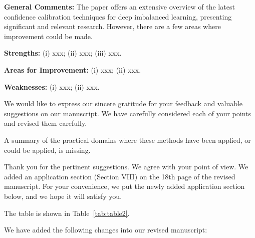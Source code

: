 
\reviewer

\begin{generalcomment}
    \textbf{General Comments:} The paper offers an extensive overview of the latest confidence calibration techniques for deep imbalanced learning, presenting significant and relevant research. However, there are a few areas where improvement could be made.
   
    \textbf{Strengths:} (i) xxx; (ii) xxx; (iii) xxx.

    \textbf{Areas for Improvement:} (i) xxx; (ii) xxx. 
     
    \textbf{Weaknesses:} (i) xxx; (ii) xxx. 

\end{generalcomment}
\begin{revmeta}[]
	We would like to express our sincere gratitude for your feedback and valuable suggestions on our manuscript. We have carefully considered each of your points and revised them carefully.
\end{revmeta}

\begin{revcomment}
A summary of the practical domains where these methods have been applied, or could be applied, is missing.
\label{com:rev1:Q1}
\end{revcomment}
\begin{revresponse}[]
	Thank you for the pertinent suggestions. We agree with your point of view. We added an application section (Section VIII) on the 18th page of the revised manuscript. For your convenience, we put the newly added application section below, and we hope it will satisfy you.
	
	
	\lipsum[4] \cite{gao2022comparative,zidonghua} The table is shown in Table~\ref{tab:table2}.

    
    \lipsum[5][1-2] 

    We have added the following changes into our revised manuscript:
	\begin{changes}
	
		\lipsum[2][1-2] \cite{silva2023classifier,AnExperimentalInvestigation} 

		
		\newpage
		\modified{\lipsum[3]} 
		
		
	\end{changes}
	
\end{revresponse}

